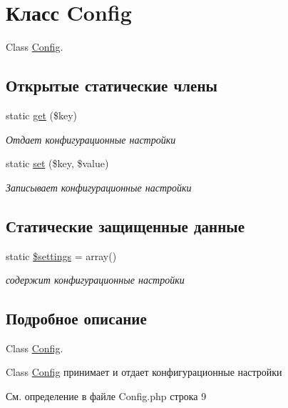 \hypertarget{class_config}{\section{Класс Config}
\label{class_config}
}


Class \hyperlink{class_config}{Config}.  


\subsection*{Открытые статические члены}
\begin{DoxyCompactItemize}
\item 
static \hyperlink{class_config_a15e2679f2a8f6fa4d60757f4d65413ac}{get} (\$key)
\begin{DoxyCompactList}\small\item\em Отдает конфигурационные настройки \end{DoxyCompactList}\item 
static \hyperlink{class_config_aa485369b2925858d92e468d405bd0798}{set} (\$key, \$value)
\begin{DoxyCompactList}\small\item\em Записывает конфигурационные настройки \end{DoxyCompactList}\end{DoxyCompactItemize}
\subsection*{Статические защищенные данные}
\begin{DoxyCompactItemize}
\item 
static \hyperlink{class_config_ac7c3353107070daa85f641882931b358}{\$settings} = array()
\begin{DoxyCompactList}\small\item\em содержит конфигурационные настройки \end{DoxyCompactList}\end{DoxyCompactItemize}


\subsection{Подробное описание}
Class \hyperlink{class_config}{Config}. 

Class \hyperlink{class_config}{Config} принимает и отдает конфигурационные настройки 

См. определение в файле Config.\-php строка 9




